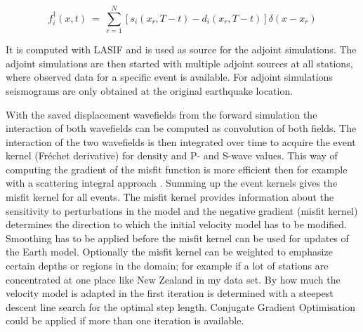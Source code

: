 \begin{equation}
f_i^{\dagger}(x,t) \ = \ \sum_{r=1}^N [ s_i(x_r, T-t) - d_i(x_r, T-t) ] \delta (x-x_r)
\end{equation}

It is computed with LASIF and is used as source for the adjoint simulations.
The adjoint simulations are then started with multiple adjoint sources at all stations, where observed data for a 
specific event is available. 
For adjoint simulations seismograms are only obtained at the original earthquake location.

%
%
With the saved displacement wavefields from the forward simulation the interaction of both wavefields can be computed as
convolution of both fields.
The interaction of the two wavefields is then integrated over time to acquire the event kernel (Fr\'{e}chet derivative)
for density and P- and S-wave values.
This way of computing the gradient of the misfit function is more efficient then for example with a scattering integral
approach \citep{Fichtner2006a}.
%
Summing up the event kernels gives the misfit kernel for all events.
The misfit kernel provides information about the sensitivity to perturbations in the model \citep{Magnoni2012}
and the negative gradient (misfit kernel) determines the direction to which the initial velocity model has to be modified. 
Smoothing has to be applied before the misfit kernel can be used for updates of the Earth model.
Optionally the misfit kernel can be weighted to emphasize certain depths or regions in the domain;
for example if a lot of stations are concentrated at one place like New Zealand in my data set.
By how much the velocity model is adapted in the first iteration is determined with a steepest descent line
search for the optimal step length.
Conjugate Gradient Optimisation could be applied if more than one iteration is available.


